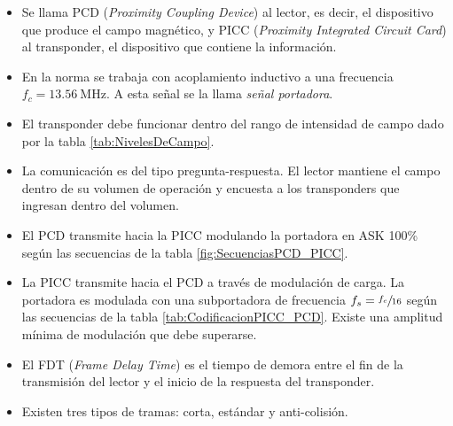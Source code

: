 \begin{itemize}
	\item Se llama PCD (\emph{Proximity Coupling Device}) al lector, 
	es decir, el dispositivo que produce el campo magnético, y 
	PICC (\emph{Proximity Integrated Circuit Card}) al transponder, el 
	dispositivo que contiene la información.
	
	\item En la norma se trabaja con acoplamiento inductivo a una 
	frecuencia \(f_{c}=\SI{13.56}{\mega\hertz}\). A esta señal se la 
	llama \emph{señal portadora}.
	
	\item El transponder debe funcionar dentro del rango de intensidad 
	de campo dado por la tabla \ref{tab:NivelesDeCampo}.
	
	\item La comunicación es del tipo pregunta-respuesta. El lector 
	mantiene el campo dentro de su volumen de operación y encuesta a los 
	transponders que ingresan dentro del volumen.
	
	\item El PCD transmite hacia la PICC modulando la portadora en ASK 
	100\% según las secuencias de la tabla 
	\ref{fig:SecuenciasPCD_PICC}.
	
	\item La PICC transmite hacia el PCD a través de modulación de 
	carga. La portadora es modulada con una subportadora de frecuencia 
	\(f_{s}=\sfrac{f_{c}}{16}\) según las secuencias de la tabla 
	\ref{tab:CodificacionPICC_PCD}. Existe una amplitud mínima de 
	modulación que debe superarse.
	
	\item El FDT (\emph{Frame Delay Time}) es el tiempo de demora 
	entre el fin de la transmisión del lector y el inicio de la 
	respuesta del transponder.
	
	\item Existen tres tipos de tramas: corta, estándar y 
	anti-colisión.
\end{itemize}
